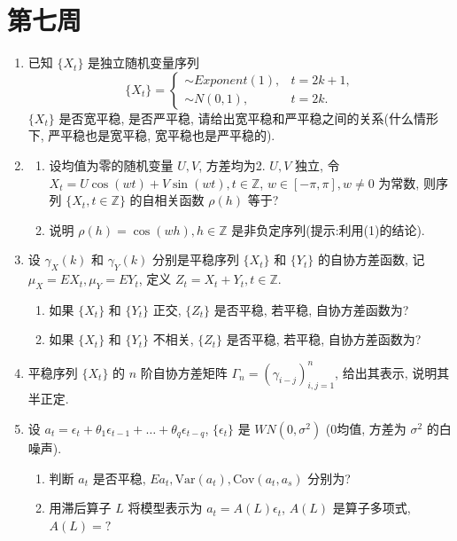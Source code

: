 \section{第七周}
\begin{enumerate}

\item 已知 $\{X_t\}$ 是独立随机变量序列
\[
\{X_{t}\}=\begin{cases}
\sim Exponent(1), & t=2k+1, \\
\sim N(0,1), & t=2k.
\end{cases}
\]
$\{X_t\}$ 是否宽平稳, 是否严平稳,
请给出宽平稳和严平稳之间的关系(什么情形下, 严平稳也是宽平稳, 宽平稳也是严平稳的).

\item
\begin{enumerate}
    \item[(1)] 设均值为零的随机变量 $U, V$, 方差均为2. $U, V$ 独立, 令 $X_{t}=U \cos(wt)+V \sin(wt), t\in \mathbb{Z}$, $w \in [-\pi, \pi], w \ne 0$ 为常数, 则序列 $\{X_{t}, t\in \mathbb{Z}\}$ 的自相关函数 $\rho(h)$ 等于?
    \item[(2)] 说明 $\rho(h)=\cos(wh), h\in \mathbb{Z}$ 是非负定序列(提示:利用(1)的结论).
\end{enumerate}

\item 设 $\gamma_{X}(k)$ 和 $\gamma_{Y}(k)$ 分别是平稳序列 $\{X_{t}\}$ 和 $\{Y_{t}\}$ 的自协方差函数, 记 $\mu_{X}=EX_{t}, \mu_{Y}=EY_{t}$, 定义 $Z_{t}=X_{t}+Y_{t}, t\in \mathbb{Z}$.
\begin{enumerate}
    \item[(1)] 如果 $\{X_{t}\}$ 和 $\{Y_{t}\}$ 正交, $\{Z_{t}\}$ 是否平稳, 若平稳, 自协方差函数为?
    \item[(2)] 如果 $\{X_{t}\}$ 和 $\{Y_{t}\}$ 不相关, $\{Z_{t}\}$ 是否平稳, 若平稳, 自协方差函数为?
\end{enumerate}

\item 平稳序列 $\{X_{t}\}$ 的 $n$ 阶自协方差矩阵 $\Gamma_{n}=(\gamma_{i-j})_{i,j=1}^{n}$, 给出其表示, 说明其半正定.

\item 设 $a_{t}=\epsilon_{t}+\theta_{1}\epsilon_{t-1}+\dots+\theta_{q}\epsilon_{t-q}$, $\{\epsilon_{t}\}$ 是 $WN(0,\sigma^{2})$ (0均值, 方差为 $\sigma^2$ 的白噪声).
\begin{enumerate}
    \item[1)] 判断 $a_t$ 是否平稳, $Ea_{t}, \text{Var}(a_{t}), \text{Cov}(a_{t},a_{s})$ 分别为?
    \item[2)] 用滞后算子 $L$ 将模型表示为 $a_{t}=A(L)\epsilon_{t}$, $A(L)$ 是算子多项式, $A(L)=?$
\end{enumerate}


\end{enumerate}
